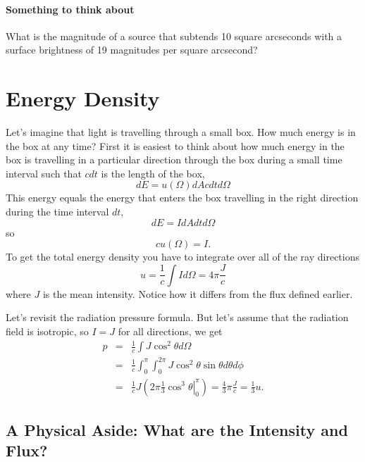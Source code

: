 \paragraph{Something to think about}
What is the magnitude of a source that subtends 10 square arcseconds
with a surface brightness of 19 magnitudes per square arcsecond?

\section{Energy Density}
\label{sec:energy-density}
Let's imagine that light is travelling through a small box.  How much
energy is in the box at any time?  First it is easiest to think about
how much energy in the box is travelling in a particular direction
through the box during a small time interval such that $c dt$ is the
length of the box,
\begin{equation}
d E = u(\Omega) d\!A c d t d\Omega
\label{eq:13}
\end{equation}
This energy equals the energy that enters the box travelling in the 
right direction during the time interval $dt$,
\begin{equation}
d E = I d\!A d t d\Omega
\label{eq:14}
\end{equation}
so
\begin{equation}
c u(\Omega) = I.
\label{eq:15}
\end{equation}
To get the total energy density you have to integrate over all of the 
ray directions
\begin{equation}
u = \frac{1}{c} \int I d \Omega = 4\pi \frac{J}{c}
\label{eq:16}
\end{equation}
where $J$ is the mean intensity.   Notice how it differs from the flux
defined earlier.

Let's revisit the radiation pressure formula.   But let's assume that
the radiation field is isotropic, so $I=J$ for all directions, we get
\begin{eqnarray}
\label{eq:17}
p &=& \frac{1}{c} \int J \cos^2\theta d \Omega \\
\label{eq:18}
  &=& \frac{1}{c} \int_0^\pi \int_0^{2\pi}J \cos^2\theta \sin\theta d\theta d \phi \\
  &=& \frac{1}{c} J \left ( 2 \pi \left . \frac{1}{3} \cos^3\theta \right |_0^\pi
  \right ) = \frac{4}{3} \pi \frac{J}{c} = \frac{1}{3} u.
\label{eq:19}
\end{eqnarray}

\subsection[A Physical Aside: Intensity and Flux]{A Physical Aside: What are the Intensity and Flux?}
\label{sec:physical-aside:-what}

